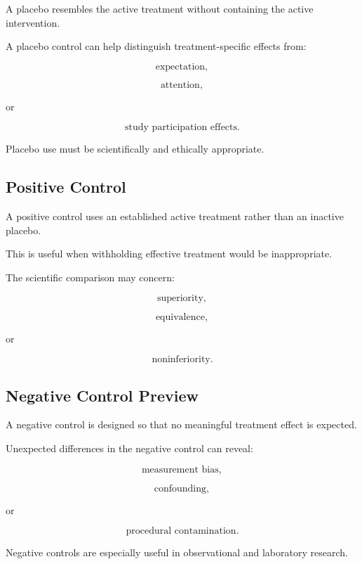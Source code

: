 A placebo resembles the active treatment without containing the active
intervention.

A placebo control can help distinguish treatment-specific effects from:

\[
\boxed{
\text{expectation},
}
\]

\[
\boxed{
\text{attention},
}
\]

or

\[
\boxed{
\text{study participation effects}.
}
\]

Placebo use must be scientifically and ethically appropriate.

\subsection{Positive Control}
\label{subsec:positive-control}

A positive control uses an established active treatment rather than an
inactive placebo.

This is useful when withholding effective treatment would be
inappropriate.

The scientific comparison may concern:

\[
\boxed{
\text{superiority},
}
\]

\[
\boxed{
\text{equivalence},
}
\]

or

\[
\boxed{
\text{noninferiority}.
}
\]

\subsection{Negative Control Preview}
\label{subsec:negative-control}

A negative control is designed so that no meaningful treatment effect is
expected.

Unexpected differences in the negative control can reveal:

\[
\boxed{
\text{measurement bias},
}
\]

\[
\boxed{
\text{confounding},
}
\]

or

\[
\boxed{
\text{procedural contamination}.
}
\]

Negative controls are especially useful in observational and laboratory
research.


